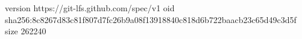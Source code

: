 version https://git-lfs.github.com/spec/v1
oid sha256:8c8267d83c81f807d7fc26b9a08f13918840c818d6b722baacb23c65d49c3d5f
size 262240
